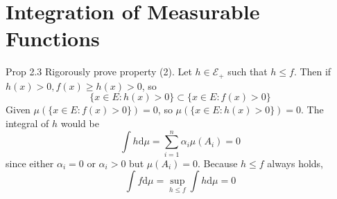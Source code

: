 \setcounter{section}{1}
\section{Integration of Measurable Functions}

\begin{note}{Prop 2.3}
    Rigorously prove property (2). Let $h\in\mathcal{E}_+$ such that $h\le f$. Then if $h(x)>0, f(x)\ge h(x)>0$, so
    \[
    \{x\in E: h(x)>0\}\subset \{x\in E: f(x)>0\}
    \]
    Given $\mu(\{x\in E: f(x)>0\})=0$, so $\mu(\{x\in E: h(x)>0\})=0$. The integral of $h$ would be
    \[
    \int h\mathrm{d}\mu=\sum_{i=1}^n \alpha_i\mu(A_i)=0
    \]
    since either $\alpha_i=0$ or $\alpha_i>0$ but $\mu(A_i)=0$. Because $h\le f$ always holds,
    \[
    \int f\mathrm{d}\mu=\sup_{h\le f} \int h\mathrm{d}\mu=0
    \]
\end{note}

